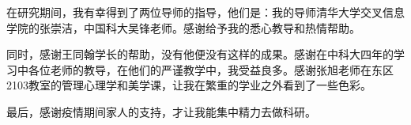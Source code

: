 
\begin{acknowledgements}

在研究期间，我有幸得到了两位导师的指导，他们是：我的导师清华大学交叉信息学院的张崇洁，中国科大吴锋老师。感谢给予我的悉心教导和热情帮助。

同时，感谢王同翰学长的帮助，没有他便没有这样的成果。感谢在中科大四年的学习中各位老师的教导，在他们的严谨教学中，我受益良多。感谢张旭老师在东区2103教室的管理心理学和美学课，让我在繁重的学业之外看到了一些色彩。

最后，感谢疫情期间家人的支持，才让我能集中精力去做科研。

\end{acknowledgements}
